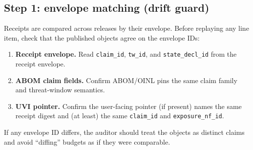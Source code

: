 \documentclass[11pt]{article}
\begin{document}
\subsection{Step 1: envelope matching (drift guard)}
Receipts are compared across releases by their envelope.
Before replaying any line item, check that the published objects agree on the envelope IDs:
\begin{enumerate}[leftmargin=*]
\item \textbf{Receipt envelope.} Read \texttt{claim\_id}, \texttt{tw\_id}, and \texttt{state\_decl\_id} from the receipt envelope.\cite{series:receiptitems}
\item \textbf{ABOM claim fields.} Confirm ABOM/OINL pins the same claim family and threat-window semantics.
\item \textbf{UVI pointer.} Confirm the user-facing pointer (if present) names the same receipt digest and (at least) the same \texttt{claim\_id} and \texttt{exposure\_nf\_id}.\cite{series:transparencyprimitives}
\end{enumerate}
If any envelope ID differs, the auditor should treat the objects as distinct claims and avoid ``diffing'' budgets as if they were comparable.\cite{series:planstateequiv}
\end{document}
